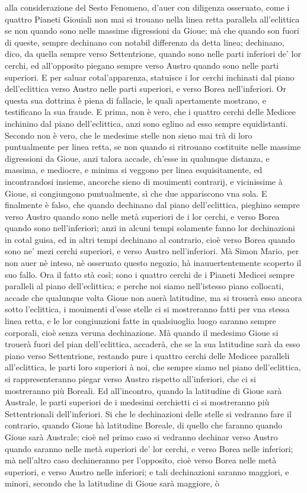 \documentclass[11pt,twoside,openany]{book}
\begin{document}
alla considerazione del Sesto Fenomeno, d'auer con diligenza osseruato, come i quattro Pianeti Giouiali non mai si trouano nella linea retta parallela all'eclittica se non quando sono nelle massime digressioni da Gioue; mà che quando son fuori di queste, sempre dechinano con notabil differenza da detta linea; dechinano, dico, da quella sempre verso Settentrione, quando sono nelle parti inferiori de' lor cerchi, ed all'opposito piegano sempre verso Austro quando sono nelle parti superiori. E per saluar cotal'apparenza, statuisce i lor cerchi inchinati dal piano dell'eclittica verso Austro nelle parti superiori, e verso Borea nell'inferiori. Or questa sua dottrina è piena di fallacie, le quali apertamente mostrano, e testificano la sua fraude. E prima, non è vero, che i quattro cerchi delle Medicee inchinino dal piano dell'eclittica, anzi sono eglino ad esso sempre equidistanti. Secondo non è vero, che le medesime stelle non sieno mai trà di loro puntualmente per linea retta, se non quando si ritrouano costituite nelle massime digressioni da Gioue, anzi talora accade, ch'esse in qualunque distanza, e massima, e mediocre, e minima si veggono per linea esquisitamente, ed incontrandosi insieme, ancorche sieno di mouimenti contrarij, e vicinissime à Gioue, si congiungono puntualmente, sì che due appariscono vna sola. E finalmente è falso, che quando dechinano dal piano dell'eclittica, pieghino sempre verso Austro quando sono nelle metà superiori de i lor cerchi, e verso Borea quando sono nell'inferiori; anzi in alcuni tempi solamente fanno lor dechinazioni in cotal guisa, ed in altri tempi dechinano al contrario, cioè verso Borea quando sono ne' mezi cerchi superiori, e verso Austro nell'inferiori. Mà Simon Mario, per non auer nè inteso, nè osseruato questo negozio, hà inauuertentemente scoperto il suo fallo. Ora il fatto stà così; sono i quattro cerchi de i Pianeti Medicei sempre paralleli al piano dell'eclittica; e perche noi siamo nell'istesso piano collocati, accade che qualunque volta Gioue non auerà latitudine, ma si trouerà esso ancora sotto l'eclittica, i mouimenti d'esse stelle ci si mostreranno fatti per vna stessa linea retta, e le lor congiunzioni fatte in qualsiuoglia luogo saranno sempre corporali, cioè senza veruna dechinazione. Mà quando il medesimo Gioue si trouerà fuori del pian dell'eclittica, accaderà, che se la sua latitudine sarà da esso piano verso Settentrione, restando pure i quattro cerchi delle Medicee paralleli all'eclittica, le parti loro superiori à noi, che sempre siamo nel piano dell'eclittica, si rappresenteranno piegar verso Austro rispetto all'inferiori, che ci si mostreranno più Boreali. Ed all'incontro, quando la latitudine di Gioue sarà Australe, le parti superiori de i medesimi cerchietti ci si mostreranno più Settentrionali dell'inferiori. Si che le dechinazioni delle stelle si vedranno fare il contrario, quando Gioue hà latitudine Boreale, di quello che faranno quando Gioue sarà Australe; cioè nel primo caso si vedranno dechinar verso Austro quando saranno nelle metà superiori de' lor cerchi, e verso Borea nelle inferiori; mà nell'altro caso dechineranno per l'opposito, cioè verso Borea nelle metà superiori, e verso Austro nelle inferiori; e tali dechinazioni saranno maggiori, e minori, secondo che la latitudine di Gioue sarà maggiore, ò 
\end{document}
